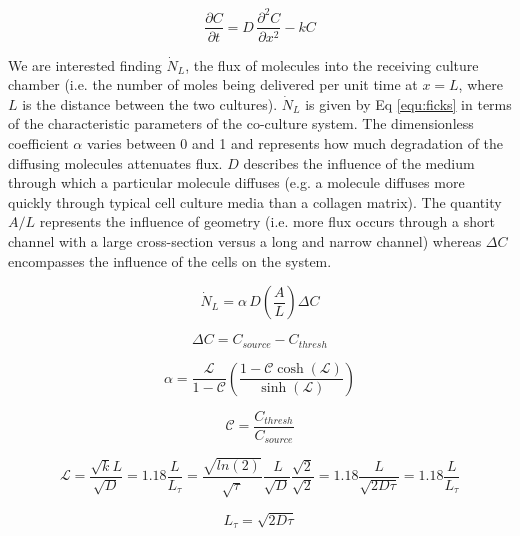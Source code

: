 \begin{equation}
\frac{\partial C}{\partial t} = D\,\frac{\partial^{2} C}{\partial x^{2}} - k C
\label{equ:diffusion}
\end{equation}

We are interested finding $\dot{N}_{L}$, the flux of molecules into the receiving culture chamber (i.e. the number of moles being delivered per unit time at $x=L$, where $L$ is the distance between the two cultures). $\dot{N}_{L}$ is given by Eq \ref{equ:ficks} in terms of the characteristic parameters of the co-culture system. The dimensionless coefficient $\alpha$ varies between 0 and 1 and represents how much degradation of the diffusing molecules attenuates flux. $D$ describes the influence of the medium through which a particular molecule diffuses (e.g. a molecule diffuses more quickly through typical cell culture media than a collagen matrix). The quantity $A/L$ represents the influence of geometry (i.e. more flux occurs through a short channel with a large cross-section versus a long and narrow channel) whereas $\Delta C$ encompasses the influence of the cells on the system.

\begin{equation}
\dot{N}_{L} = \alpha \, D \left(\frac{A}{L} \right) \Delta C
\label{equ:ficks}
\end{equation}

\begin{equation}
\Delta C = C_{source}-C_{thresh}
\label{equ:deltaC}
\end{equation}

\begin{equation}
\alpha=\frac{\mathcal{L}}{1-\mathcal{C}}\left(\frac{1-\mathcal{C}\cosh(\mathcal{L})}{\sinh(\mathcal{L})}\right)
\label{equ:alpha}
\end{equation}

\begin{equation}
\mathcal{C} = \frac{C_{thresh}}{C_{source}}
\label{equ:C}
\end{equation}

\begin{equation}
\mathcal{L} = \frac{\sqrt{k}L}{\sqrt{D}} = 1.18\frac{L}{L_{\tau}} = \frac{\sqrt{ln(2)}}{\sqrt{\tau}}\frac{\,L}{\sqrt{D}}\frac{\sqrt{2}}{\sqrt{2}} = 1.18\frac{L}{\sqrt{2 D \tau}} = 1.18\frac{L}{L_{\tau}}
\label{equ:L}
\end{equation}

\begin{equation}
L_{\tau}= \sqrt{2 D \tau}
\label{equ:lTau}
\end{equation}

